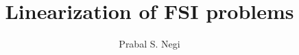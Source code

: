 \documentclass{kthreport}
\title{Linearization of FSI problems}
\author{Prabal S. Negi}
\begin{document}
\maketitle

%
%
%
%
%

%
%

%
%
%



\FloatBarrier



\end{document}

